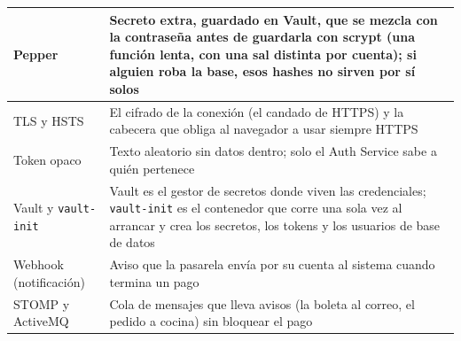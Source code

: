 {\begin{longtable}{|>{\raggedright\arraybackslash}p{}|>{\raggedright\arraybackslash}p{}|}
Pepper & Secreto extra, guardado en Vault, que se mezcla con la contraseña antes de guardarla con scrypt (una función lenta, con una sal distinta por cuenta); si alguien roba la base, esos hashes no sirven por sí solos \\ \hline
TLS y HSTS & El cifrado de la conexión (el candado de HTTPS) y la cabecera que obliga al navegador a usar siempre HTTPS \\ \hline
Token opaco & Texto aleatorio sin datos dentro; solo el Auth Service sabe a quién pertenece \\ \hline
Vault y \texttt{vault-\allowbreak{}init} & Vault es el gestor de secretos donde viven las credenciales; \texttt{vault-\allowbreak{}init} es el contenedor que corre una sola vez al arrancar y crea los secretos, los tokens y los usuarios de base de datos \\ \hline
Webhook (notificación) & Aviso que la pasarela envía por su cuenta al sistema cuando termina un pago \\ \hline
STOMP y ActiveMQ & Cola de mensajes que lleva avisos (la boleta al correo, el pedido a cocina) sin bloquear el pago \\ \hline
\end{longtable}
}
